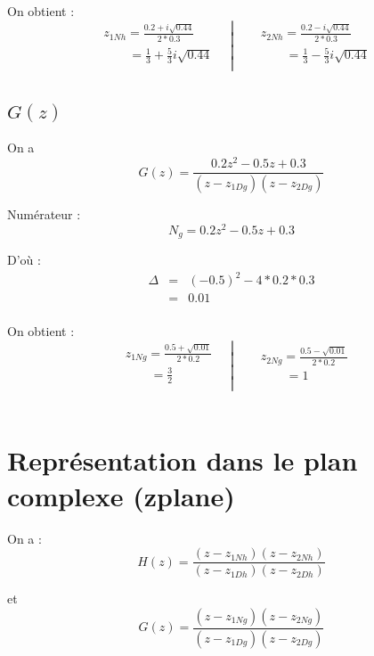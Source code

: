 \documentclass[12,french]{report}
\begin{document}
On obtient :
$$\left.\begin{aligned}
	&z_{1Nh} = \frac{0.2+i\sqrt{0.44}}{2*0.3} \\
	&\quad\quad = \frac{1}{3} + \frac{5}{3}i\sqrt{0.44} \\
\end{aligned}\quad\right|
\quad\left.\begin{aligned}
	&z_{2Nh} = \frac{0.2-i\sqrt{0.44}}{2*0.3}\\
	&\quad\quad = \frac{1}{3} - \frac{5}{3}i\sqrt{0.44} \\
\end{aligned}\right.$$

\subsection{$G(z)$}

\vspace{0.25cm}

On a $$ G(z) = \frac{0.2z^2-0.5z+0.3}{(z-z_{1Dg})(z-z_{2Dg})} $$

Numérateur : $$ N_g= 0.2z^2-0.5z+0.3 $$

D'où : $$ \begin{array}{ccl}
\Delta & = & (-0.5)^2-4*0.2*0.3 \\
	   & = & 0.01 \\
\end{array} $$

On obtient :
$$\left.\begin{aligned}
	&z_{1Ng} = \frac{0.5+\sqrt{0.01}}{2*0.2} \\
	&\quad\quad = \frac{3}{2} \\
\end{aligned}\quad\right|
\quad\left.\begin{aligned}
	&z_{2Ng} = \frac{0.5-\sqrt{0.01}}{2*0.2}\\
	&\quad\quad = 1 \\
\end{aligned}\right.$$\\

\section{Représentation dans le plan complexe (zplane)}

\vspace{0.25cm}
On a :
$$ H(z) = \frac{(z-z_{1Nh})(z-z_{2Nh})}{(z-z_{1Dh})(z-z_{2Dh})} $$

et
$$ G(z) = \frac{(z-z_{1Ng})(z-z_{2Ng})}{(z-z_{1Dg})(z-z_{2Dg})} $$
\end{document}
